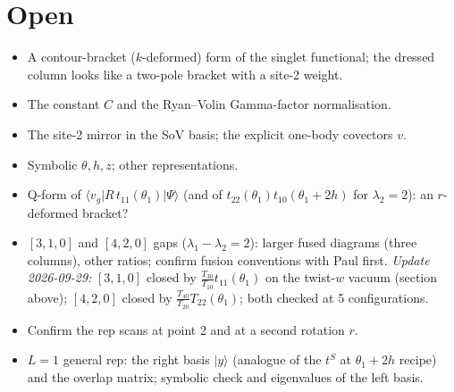 \documentclass[11pt]{article}
\theoremstyle{definition}
\theoremstyle{remark}
\begin{document}
\section{Open}
\begin{itemize}
\item A contour-bracket ($k$-deformed) form of the singlet functional; the dressed column looks like a two-pole bracket with a site-2 weight.
\item The constant $C$ and the Ryan--Volin Gamma-factor normalisation.
\item The site-2 mirror in the SoV basis; the explicit one-body covectors $v$.
\item Symbolic $\theta,h,z$; other representations.
\item Q-form of $\langle v_g|R\,t_{11}(\theta_1)|\Psi\rangle$ (and of $t_{22}(\theta_1)t_{10}(\theta_1+2h)$ for $\lambda_2=2$): an $r$-deformed bracket?
\item $[3,1,0]$ and $[4,2,0]$ gaps ($\lambda_1-\lambda_2=2$): larger fused diagrams (three columns), other ratios; confirm fusion conventions with Paul first. \emph{Update 2026-09-29:} $[3,1,0]$ closed by $\tfrac{T_{30}}{T_{10}}t_{11}(\theta_1)$ on the twist-$w$ vacuum (section above); $[4,2,0]$ closed by $\tfrac{T_{40}}{T_{20}}T_{22}(\theta_1)$; both checked at 5 configurations.
\item Confirm the rep scans at point 2 and at a second rotation $r$.
\item $L=1$ general rep: the right basis $|y\rangle$ (analogue of the $t^S$ at $\theta_1+2h$ recipe) and the overlap matrix; symbolic check and eigenvalues of the left basis.
\end{itemize}
\end{document}
